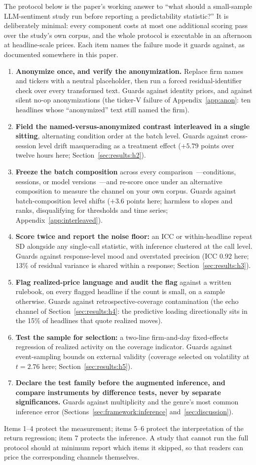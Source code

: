The protocol below is the paper's working answer to ``what should a small-sample LLM-sentiment study run before reporting a predictability statistic?'' It is deliberately minimal: every component costs at most one additional scoring pass over the study's own corpus, and the whole protocol is executable in an afternoon at headline-scale prices. Each item names the failure mode it guards against, as documented somewhere in this paper.

\begin{enumerate}
\item \textbf{Anonymize once, and verify the anonymization.} Replace firm names and tickers with a neutral placeholder, then run a forced residual-identifier check over every transformed text. Guards against identity priors, and against silent no-op anonymizations (the ticker-V failure of Appendix~\ref{app:anon}: ten headlines whose ``anonymized'' text still named the firm).
\item \textbf{Field the named-versus-anonymized contrast interleaved in a single sitting}, alternating condition order at the batch level. Guards against cross-session level drift masquerading as a treatment effect ($+5.79$ points over twelve hours here; Section~\ref{sec:results:h2}).
\item \textbf{Freeze the batch composition} across every comparison~---conditions, sessions, or model versions~---and re-score once under an alternative composition to measure the channel on your own corpus. Guards against batch-composition level shifts ($+3.6$ points here; harmless to slopes and ranks, disqualifying for thresholds and time series; Appendix~\ref{app:interleaved}).
\item \textbf{Score twice and report the noise floor:} an ICC or within-headline repeat SD alongside any single-call statistic, with inference clustered at the call level. Guards against response-level mood and overstated precision (ICC $0.92$ here; 13\% of residual variance is shared within a response; Section~\ref{sec:results:h3}).
\item \textbf{Flag realized-price language and audit the flag} against a written rulebook, on every flagged headline if the count is small, on a sample otherwise. Guards against retrospective-coverage contamination (the echo channel of Section~\ref{sec:results:h4}: the predictive loading directionally sits in the 15\% of headlines that quote realized moves).
\item \textbf{Test the sample for selection:} a two-line firm-and-day fixed-effects regression of realized activity on the coverage indicator. Guards against event-sampling bounds on external validity (coverage selected on volatility at $t=2.76$ here; Section~\ref{sec:results:h5}).
\item \textbf{Declare the test family before the augmented inference, and compare instruments by difference tests, never by separate significances.} Guards against multiplicity and the genre's most common inference error (Sections~\ref{sec:framework:inference} and~\ref{sec:discussion}).
\end{enumerate}

Items 1--4 protect the measurement; items 5--6 protect the interpretation of the return regression; item 7 protects the inference. A study that cannot run the full protocol should at minimum report which items it skipped, so that readers can price the corresponding channels themselves.
